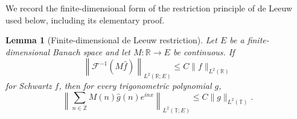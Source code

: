 \documentclass[11pt]{article}
\numberwithin{equation}{section}
\newtheorem{lemma}[theorem]{Lemma}
\theoremstyle{remark}
\theoremstyle{definition}
\begin{document}
We record the finite-dimensional form of the restriction principle of
de Leeuw \cite{deLeeuw1965} used below, including its elementary proof.

\begin{lemma}[Finite-dimensional de Leeuw restriction]
\label{lem:finite-dimensional-deleeuw}
Let $E$ be a finite-dimensional Banach space and let $M:\mathbb R\to E$ be
continuous.  If
\[
 \left\|\mathcal F^{-1}(M\widehat f)\right\|_{L^2(\mathbb R;E)}
 \le C\|f\|_{L^2(\mathbb R)}
\]
for Schwartz $f$, then for every trigonometric polynomial $g$,
\begin{equation}\label{eq:deleeuw-vector-restriction}
 \left\|\sum_{n\in\mathbb Z}M(n)\widehat g(n)e^{inx}
 \right\|_{L^2(\mathbb T;E)}
 \le C\|g\|_{L^2(\mathbb T)}.
\end{equation}
\end{lemma}
\end{document}

